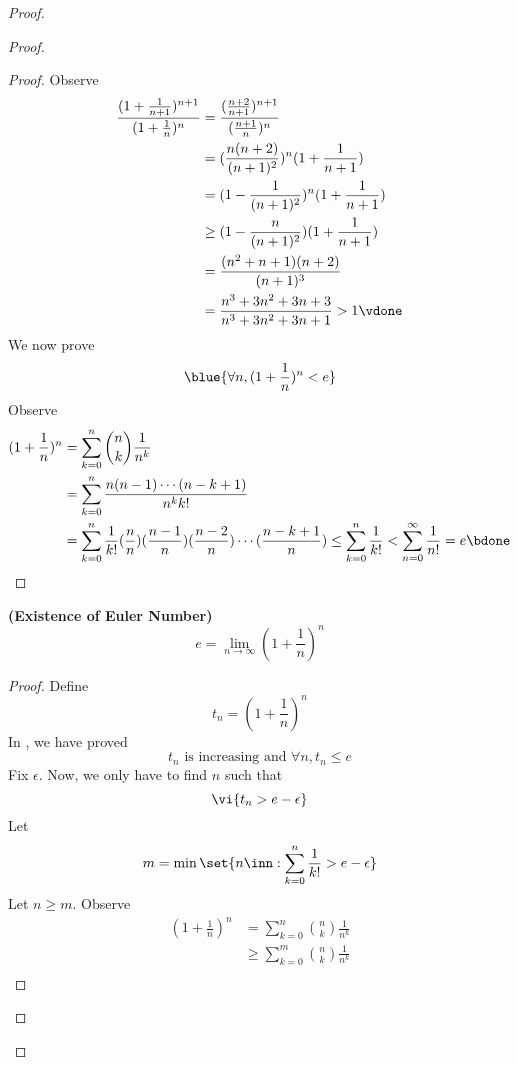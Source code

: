 \documentclass{report}
\begin{document}
\begin{proof}
\begin{proof}
\begin{proof}
Observe
\begin{align}
\frac{(1+\frac{1}{n+1})^{n+1}}{(1+\frac{1}{n})^n}&=\frac{(\frac{n+2}{n+1})^{n+1}}{(\frac{n+1}{n})^n}\\
&=(\frac{n(n+2)}{(n+1)^2})^n(1+\frac{1}{n+1})\\
&=(1-\frac{1}{(n+1)^2})^n (1+\frac{1}{n+1})\\
&\geq (1-\frac{n}{(n+1)^2})(1+\frac{1}{n+1})\\
&=\frac{(n^2+n+1)(n+2)}{(n+1)^3}\\
&=\frac{n^3+3n^2+3n+3}{n^3+3n^2+3n+1}> 1\vdone
\end{align}
We now prove
\begin{equation}
  \blue{\forall n,(1+\frac{1}{n})^n<e}
\end{equation}
Observe
\begin{align}
  (1+\frac{1}{n})^n&= \sum_{k=0}^n \binom{n}{k}\frac{1}{n^k}\\
  &=\sum_{k=0}^n \frac{n(n-1)\cdots (n-k+1)}{n^kk!}\\
  &=\sum_{k=0}^n \frac{1}{k!}(\frac{n}{n})(\frac{n-1}{n})(\frac{n-2}{n})\cdots (\frac{n-k+1}{n})\leq \sum_{k=0}^n \frac{1}{k!}<\sum_{n=0}^\infty \frac{1}{n!}=e\bdone
\end{align}
\end{proof}
\begin{theorem}
\label{4.5.5}
\textbf{(Existence of Euler Number)} 
\begin{equation}
e=\lim_{n\to\infty}(1+\frac{1}{n})^n
\end{equation}
\end{theorem}
\begin{proof}
Define 
\begin{equation}
t_n=(1+\frac{1}{n})^n
\end{equation}
In , we have proved
\begin{equation}
t_n\text{ is increasing and }\forall n, t_n\leq e
\end{equation}
Fix $\epsilon $. Now, we only have to find $n$ such that 
 \begin{equation*}
   \vi{t_n>e-\epsilon}
\end{equation*}
Let
 \begin{equation*}
m=\min \set{n\inn: \sum_{k=0}^n \frac{1}{k!}>e-\epsilon }
\end{equation*}
Let $n\geq m$. Observe
\begin{align}
  (1+\frac{1}{n})^n&= \sum_{k=0}^n \binom{n}{k}\frac{1}{n^k}\\
  &\geq \sum_{k=0}^m \binom{n}{k}\frac{1}{n^k}\\

\end{align}
\end{proof}
\end{proof}
\end{proof}
\end{document}
